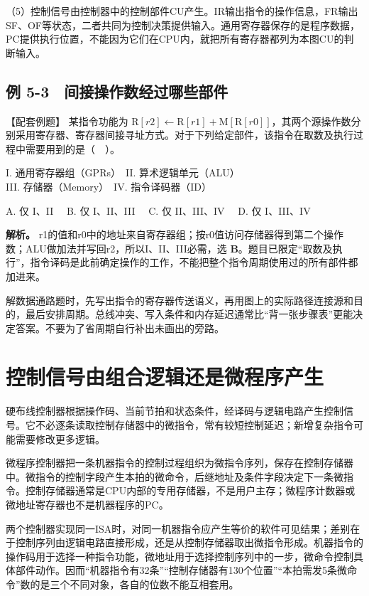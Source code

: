 （5）控制信号由控制器中的控制部件CU产生。IR输出指令的操作信息，FR输出SF、OF等状态，二者共同为控制决策提供输入。通用寄存器保存的是程序数据，PC提供执行位置，不能因为它们在CPU内，就把所有寄存器都列为本图CU的判断输入。

\subsection{例 5-3　间接操作数经过哪些部件}\label{CO05-example-3}

【配套例题】 某指令功能为 \(\mathrm R[r2]\leftarrow\mathrm R[r1]+\mathrm M[\mathrm R[r0]]\)，其两个源操作数分别采用寄存器、寄存器间接寻址方式。对于下列给定部件，该指令在取数及执行过程中需要用到的是（　）。

I. 通用寄存器组（GPRs）　II. 算术逻辑单元（ALU）\\
III. 存储器（Memory）　IV. 指令译码器（ID）

A. 仅 I、II　 B. 仅 I、II、III　 C. 仅 II、III、IV　 D. 仅 I、III、IV

\textbf{解析。} r1的值和r0中的地址来自寄存器组；按r0值访问存储器得到第二个操作数；ALU做加法并写回r2，所以I、II、III必需，选 \textbf{B}。题目已限定``取数及执行''，指令译码是此前确定操作的工作，不能把整个指令周期使用过的所有部件都加进来。

解数据通路题时，先写出指令的寄存器传送语义，再用图上的实际路径连接源和目的，最后安排周期。总线冲突、写入条件和内存延迟通常比``背一张步骤表''更能决定答案。不要为了省周期自行补出未画出的旁路。

\section{控制信号由组合逻辑还是微程序产生}\label{CO05-control}

硬布线控制器根据操作码、当前节拍和状态条件，经译码与逻辑电路产生控制信号。它不必逐条读取控制存储器中的微指令，常有较短控制延迟；新增复杂指令可能需要修改更多逻辑。

微程序控制器把一条机器指令的控制过程组织为微指令序列，保存在控制存储器中。微指令的控制字段产生本拍的微命令，后继地址及条件字段决定下一条微指令。控制存储器通常是CPU内部的专用存储器，不是用户主存；微程序计数器或微地址寄存器也不是机器程序的PC。

两个控制器实现同一ISA时，对同一机器指令应产生等价的软件可见结果；差别在于控制序列由逻辑电路直接形成，还是从控制存储器取出微指令形成。机器指令的操作码用于选择一种指令功能，微地址用于选择控制序列中的一步，微命令控制具体部件动作。因而``机器指令有32条''``控制存储器有130个位置''``本拍需发5条微命令''数的是三个不同对象，各自的位数不能互相套用。

